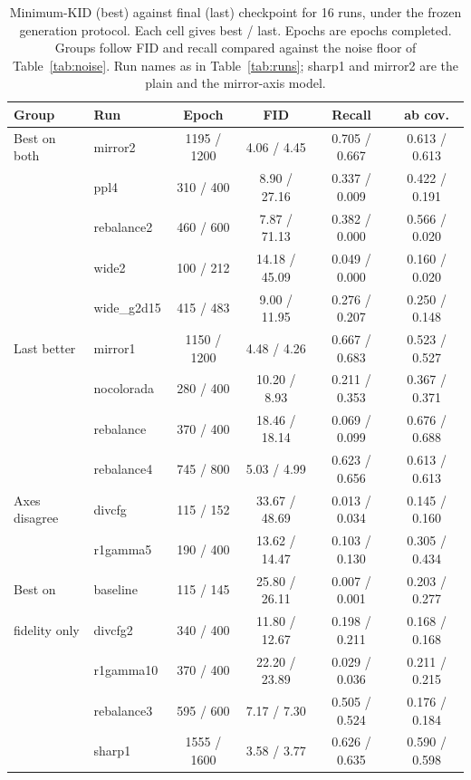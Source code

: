 \documentclass[electronics,article,submit,pdftex,moreauthors]{Definitions/mdpi}
\begin{document}
\begin{table}[H]
\caption{Minimum-KID (best) against final (last) checkpoint for 16 runs,
under the frozen generation protocol. Each cell gives best / last. Epochs
are epochs completed. Groups follow FID and recall compared against the noise floor of Table~\ref{tab:noise}. Run names as in Table~\ref{tab:runs}; sharp1 and mirror2 are the plain and the mirror-axis model.}
\label{tab:bestlast}
\small
\setlength{\tabcolsep}{4pt}
\begin{tabular}{llcccc}
\toprule
\textbf{Group} & \textbf{Run} & \textbf{Epoch} & \textbf{FID} &
\textbf{Recall} & \textbf{ab cov.} \\
\midrule
Best on both & mirror2      & 1195 / 1200 & 4.06 / 4.45   & 0.705 / 0.667 & 0.613 / 0.613 \\
             & ppl4         & 310 / 400   & 8.90 / 27.16  & 0.337 / 0.009 & 0.422 / 0.191 \\
             & rebalance2   & 460 / 600   & 7.87 / 71.13  & 0.382 / 0.000 & 0.566 / 0.020 \\
             & wide2        & 100 / 212   & 14.18 / 45.09 & 0.049 / 0.000 & 0.160 / 0.020 \\
             & wide\_g2d15  & 415 / 483   & 9.00 / 11.95  & 0.276 / 0.207 & 0.250 / 0.148 \\
\midrule
Last better  & mirror1      & 1150 / 1200 & 4.48 / 4.26   & 0.667 / 0.683 & 0.523 / 0.527 \\
             & nocolorada   & 280 / 400   & 10.20 / 8.93  & 0.211 / 0.353 & 0.367 / 0.371 \\
             & rebalance    & 370 / 400   & 18.46 / 18.14 & 0.069 / 0.099 & 0.676 / 0.688 \\
             & rebalance4   & 745 / 800   & 5.03 / 4.99   & 0.623 / 0.656 & 0.613 / 0.613 \\
\midrule
Axes disagree & divcfg      & 115 / 152   & 33.67 / 48.69 & 0.013 / 0.034 & 0.145 / 0.160 \\
             & r1gamma5     & 190 / 400   & 13.62 / 14.47 & 0.103 / 0.130 & 0.305 / 0.434 \\
\midrule
Best on      & baseline     & 115 / 145   & 25.80 / 26.11 & 0.007 / 0.001 & 0.203 / 0.277 \\
fidelity only & divcfg2     & 340 / 400   & 11.80 / 12.67 & 0.198 / 0.211 & 0.168 / 0.168 \\
             & r1gamma10    & 370 / 400   & 22.20 / 23.89 & 0.029 / 0.036 & 0.211 / 0.215 \\
             & rebalance3   & 595 / 600   & 7.17 / 7.30   & 0.505 / 0.524 & 0.176 / 0.184 \\
             & sharp1       & 1555 / 1600 & 3.58 / 3.77   & 0.626 / 0.635 & 0.590 / 0.598 \\
\bottomrule
\end{tabular}
\end{table}
\end{document}
